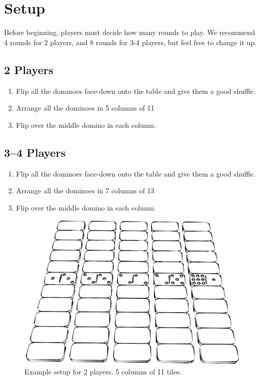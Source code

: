 \section{Setup}
Before beginning, players must decide how many rounds to play. 
We recommend 4 rounds for 2 players, and 8 rounds for 3-4 players, but feel free to change it up.
\subsection{2 Players}

\begin{enumerate}
    \item Flip all the dominoes face-down onto the table and give them a good shuffle.
    \item Arrange all the dominoes in 5 columns of 11
    \item Flip over the middle domino in each column.
\end{enumerate}

\subsection{3--4 Players}

\begin{enumerate}
    \item Flip all the dominoes face-down onto the table and give them a good shuffle.
    \item Arrange all the dominoes in 7 columns of 13
    \item Flip over the middle domino in each column.
\end{enumerate}

\begin{figure}[ht]
\centering
\includegraphics[width = \linewidth]{graphics/dominoes-setup.png}
\caption{Example setup for 2 players. 5 columns of 11 tiles.}
\end{figure}
